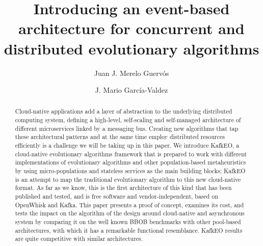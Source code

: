 \documentclass{llncs}
\begin{document}
\sloppy

\title{Introducing an event-based architecture for concurrent and distributed evolutionary algorithms}

\author{Juan J. Merelo Guerv\'os \and J. Mario Garc\'ia-Valdez}

%

%
\tocauthor{ }
%




\maketitle

\begin{abstract}

Cloud-native applications add a layer of abstraction to the
underlying distributed computing system, defining a high-level,
self-scaling and self-managed architecture of different microservices
linked by a messaging bus. Creating new algorithms that tap these
architectural patterns and at the same time employ distributed
resources efficiently is a challenge we will be taking up in this
paper. We introduce KafkEO, a cloud-native evolutionary algorithms
framework that is prepared to work with different implementations of
evolutionary algorithms and other population-based metaheuristics by using
micro-populations and stateless services as the main building
blocks; KafkEO is an attempt to map the traditional evolutionary
algorithm to this new cloud-native format. As far as we know, this is the first
architecture of this kind that has been published and tested, and is free 
software and vendor-independent, based on OpenWhisk and Kafka. 
This paper presents a proof of concept, examines its cost, and tests 
the impact on the algorithm of the design around
cloud-native and asynchronous system by comparing it on
the well known BBOB benchmarks with other pool-based architectures,
with which it has a remarkable functional resemblance. KafkEO results are 
quite competitive with similar architectures.


\end{abstract}
\end{document}
